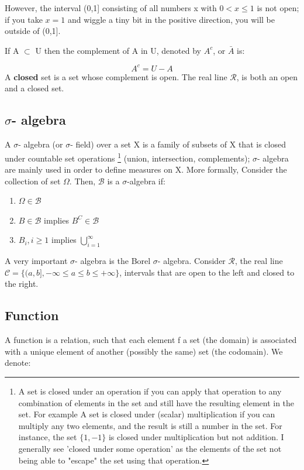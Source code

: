 \documentclass[12pt]{article}
\begin{document}
However, the interval (0,1] consisting of all numbers x with $0<x\leq1$ is not open; if you take $x=1$ and wiggle a tiny bit in the positive direction, you will be outside of (0,1].

If A $\subset$ U then the complement of A in U, denoted by $A^c$, or $\bar{A}$ is:

\begin{equation}
A^c=U-A
\end{equation}
A \textbf{closed} set is a set whose complement is open. The real line $\mathcal{R}$, is both an open and a closed set.
\subsection{$\sigma$- algebra}

A $\sigma$- algebra (or $\sigma$- field) over a set X is a family of subsets of X that is closed under countable set operations 
\footnote{A set is closed under an operation if you can apply that operation to any combination of elements in the set and still have the resulting element in the set. For example A set is closed under (scalar) multiplication if you can multiply any two elements, and the result is still a number in the set. For instance, the set $\{1,-1\}$ is closed under multiplication but not addition. I generally see 'closed under some operation' as the elements of the set not being able to "escape" the set using that operation.} (union, intersection, complements); 
$\sigma$- algebra are mainly used in order to define measures on X. More formally, Consider the collection of set $\Omega$. Then, $\mathcal{B}$ is a $\sigma$-algebra if:

\begin{enumerate}
	\item $\Omega \in \mathcal{B}$
	\item $B \in \mathcal{B}$ implies $B^C \in \mathcal{B}$
	\item $B_{i}, i \geq 1$ implies $\bigcup^{\infty}_{i=1}$
\end{enumerate}

A very important $\sigma$- algebra is the Borel $\sigma$- algebra. Consider $\mathcal{R}$, the real line $\mathcal{C} =\{(a,b],-\infty\leq a \leq b \leq+\infty\}$, intervals that are open to the left and closed to the right.

\subsection{Function}
A function is a relation, such that each element f a set (the domain) is associated with a unique element of another (possibly the same) set (the codomain). We denote:
\end{document}
